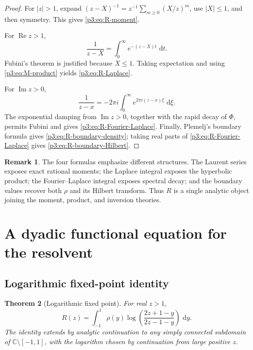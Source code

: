 \documentclass[11pt,oneside]{article}
\newtheorem{theorem}{Theorem}[section]
\theoremstyle{definition}
\newtheorem{remark}[theorem]{Remark}
\newcommand{\dd}{\,\mathrm d}
\newcommand{\C}{\mathbb C}
\begin{document}
\begin{proof}
For \(|z|>1\), expand \((z-X)^{-1}=z^{-1}\sum_{m\ge0}(X/z)^m\), use
\(|X|\le1\), and then symmetry.  This gives \eqref{p3:eq:R-moment}.

For \(\operatorname{Re}z>1\),
\[
 \frac1{z-X}=\int_0^{\infty}e^{-(z-X)t}\,\dd t.
\]
Fubini's theorem is justified because \(X\le1\).  Taking expectation and using
\eqref{p3:eq:M-product} yields \eqref{p3:eq:R-Laplace}.

For \(\operatorname{Im}z>0\),
\[
 \frac1{z-x}=-2\pi i\int_0^{\infty}e^{2\pi i(z-x)\xi}\,\dd\xi.
\]
The exponential damping from \(\operatorname{Im}z>0\), together with the rapid decay of
\(\Phi\), permits Fubini and gives \eqref{p3:eq:R-Fourier-Laplace}.  Finally,
Plemelj's boundary formula gives \eqref{p3:eq:R-boundary-density}; taking real parts of
\eqref{p3:eq:R-Fourier-Laplace} gives \eqref{p3:eq:R-boundary-Hilbert}.
\end{proof}

\begin{remark}
The four formulas emphasize different structures.  The Laurent series exposes exact
rational moments; the Laplace integral exposes the hyperbolic product; the Fourier--Laplace
integral exposes spectral decay; and the boundary values recover both \(\rho\) and its
Hilbert transform.  Thus \(R\) is a single analytic object joining the moment, product,
and inversion theories.
\end{remark}

\section{A dyadic functional equation for the resolvent}

\subsection{Logarithmic fixed-point identity}

\begin{theorem}[Logarithmic fixed point]\label{p3:thm:R-log-fixed}
For real \(z>1\),
\begin{equation}
 R(z)=\int_{-1}^{1}\rho(y)
 \log\!\left(\frac{2z+1-y}{2z-1-y}\right)\,\dd y.           \label{p3:eq:R-log-fixed}
\end{equation}
The identity extends by analytic continuation to any simply connected subdomain of
\(\C\setminus[-1,1]\), with the logarithm chosen by continuation from large positive
\(z\).
\end{theorem}
\end{document}
